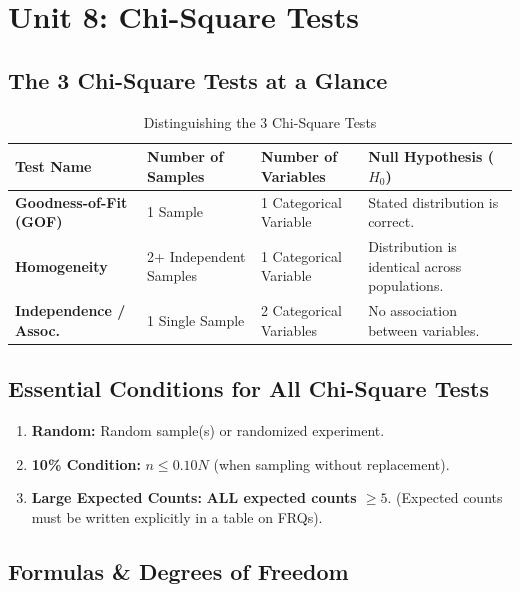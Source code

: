\chapter{Unit 8: Chi-Square Tests}

\section{The 3 Chi-Square Tests at a Glance}

\begin{table}[H]
\centering
\small
\begin{tabular}{@{}llll@{}}
\toprule
\textbf{Test Name} & \textbf{Number of Samples} & \textbf{Number of Variables} & \textbf{Null Hypothesis ($H_0$)} \\
\midrule
\textbf{Goodness-of-Fit (GOF)} & 1 Sample & 1 Categorical Variable & Stated distribution is correct. \\
\textbf{Homogeneity} & 2+ Independent Samples & 1 Categorical Variable & Distribution is identical across populations. \\
\textbf{Independence / Assoc.} & 1 Single Sample & 2 Categorical Variables & No association between variables. \\
\bottomrule
\end{tabular}
\caption{Distinguishing the 3 Chi-Square Tests}
\end{table}

\section{Essential Conditions for All Chi-Square Tests}

\begin{enumerate}
    \item \textbf{Random:} Random sample(s) or randomized experiment.
    \item \textbf{10\% Condition:} $n \le 0.10N$ (when sampling without replacement).
    \item \textbf{Large Expected Counts:} \textbf{ALL expected counts $\ge 5$}. (Expected counts must be written explicitly in a table on FRQs).
\end{enumerate}

\section{Formulas \& Degrees of Freedom}

